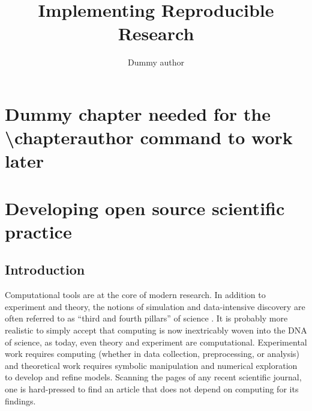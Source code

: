 \documentclass[ChapterTOCs,krantz2]{krantz} %
\begin{document}
\title{Implementing Reproducible Research}
\author{Dummy author}
\chapter*{Dummy chapter needed for the \textbackslash chapterauthor command to work later}

\mainmatter


\chapter{Developing open source scientific practice}


\section{Introduction}\label{intro}

Computational tools are at the core of modern research. In addition to
experiment and theory, the notions of simulation and data-intensive discovery
are often referred to as ``third and fourth pillars'' of science
\cite{4th-paradigm}.  It is probably more realistic to simply accept that
computing is now inextricably woven into the DNA of science, as today, even
theory and experiment are computational.  Experimental work requires computing
(whether in data collection, preprocessing, or analysis) and theoretical work
requires symbolic manipulation and numerical exploration to develop and refine
models. Scanning the pages of any recent scientific journal, one is
hard-pressed to find an article that does not depend on computing for its
findings.
\end{document}
